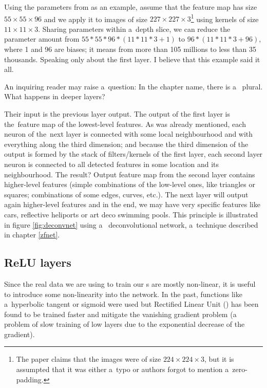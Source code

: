 Using the parameters from \cite{cnn-classification} as an example, assume that 
the feature map has size $55 \times 55 \times 96$ and we apply it to images of 
size $227 \times 227 \times 3$\footnote{The paper claims that the images were of 
size $224 \times 224 \times 3$, but it is assumpted that it was either a~typo or 
authors forgot to mention a~zero-padding.} using kernels of size $11 \times 11 
\times 3$. Sharing parameters within a~depth slice, we can reduce the parameter 
amount from $55 * 55 * 96 * (11 * 11 * 3 + 1)$ to $96 * (11 * 11 * 3 + 96)$, where 1 
and 96 are biases; it means from more than 105 millions to less than 35 
thousands. Speaking only about the first layer. I believe that this example said 
it all. 

An inquiring reader may raise a~question: In the chapter name, there is a~
plural. What happens in deeper layers? 

Their input is the previous layer output. The output of the first layer is
the~feature map of the lowest-level features. As was already mentioned, each neuron 
of the~next layer is connected with some local neighbourhood and with everything 
along the third dimension; and because the third dimension of the output is 
formed by the stack of filters/kernels of the first layer, each second layer 
neuron is connected to all detected features in some location and its 
neighbourhood. The result? Output feature map from the second layer contains 
higher-level features (simple combinations of the low-level ones, like triangles 
or squares; combinations of some edges, curves, etc.). The next layer 
will output again higher-level features and in the end, we may have very 
specific features like cars, reflective heliports or art deco swimming pools. 
This principle is illustrated in figure \ref{fig:deconvnet} using a~
deconvolutional network, a~technique described in chapter \ref{zfnet}.

\subsection{ReLU layers}
\label{relu-layers}

Since the real data we are using to train our s are mostly non-linear, 
it is useful to introduce some non-linearity into the network. In the past, 
functions like a~hyperbolic tangent or sigmoid were used but Rectified Linear 
Unit () has been found to be trained faster and mitigate the vanishing 
gradient problem (a problem of slow training of low layers due to the exponential 
decrease of the gradient). 

